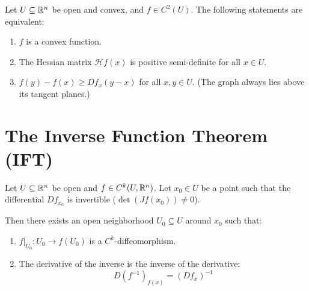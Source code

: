\begin{center}
\end{center}


\begin{proposition*}
Let $U \subseteq \mathbb{R}^n$ be open and convex, and $f \in C^2(U)$. The following statements are equivalent:
\begin{enumerate}
    \item $f$ is a convex function.
    \item The Hessian matrix $\mathscr{H}f(x)$ is positive semi-definite for all $x \in U$.
    \item $f(y) - f(x) \ge Df_x(y-x)$ for all $x, y \in U$. \textcolor{eGray}{(The graph always lies above its tangent planes.)}
\end{enumerate}
\end{proposition*}

\hrulefill

\section{The Inverse Function Theorem (IFT)}

\begin{theorem*}
Let $U \subseteq \mathbb{R}^n$ be open and $f \in C^k(U, \mathbb{R}^n)$. Let $x_0 \in U$ be a point such that the differential $Df_{x_0}$ is invertible ($\det(Jf(x_0)) \ne 0$).

Then there exists an open neighborhood $U_0 \subseteq U$ around $x_0$ such that:
\begin{enumerate}
    \item $f|_{U_0}: U_0 \to f(U_0)$ is a $C^k$-diffeomorphism.
    \item The derivative of the inverse is the inverse of the derivative: 
    \[ D(f^{-1})_{f(x)} = (Df_x)^{-1} \]
\end{enumerate}
\end{theorem*}


